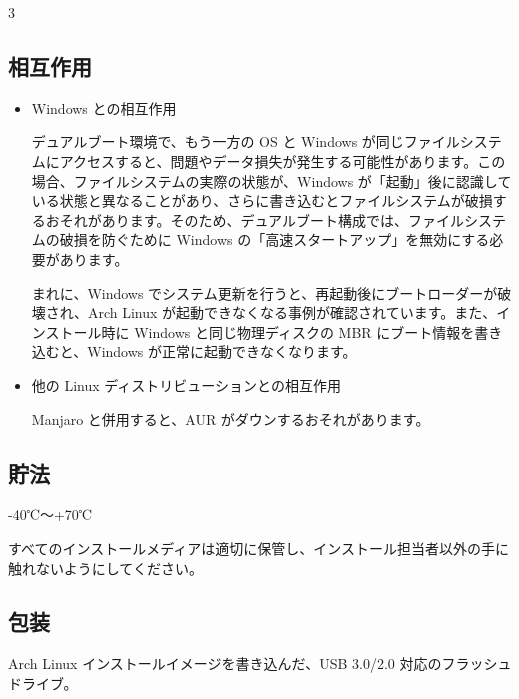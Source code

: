 \documentclass{article}
\begin{document}
\begin{multicols*}{3}
\begin{tcolorbox}
	\section*{相互作用}
	\end{tcolorbox}
	\begin{itemize}[leftmargin=*]
		\setlength{\parindent}{0pt}

		\item Windows との相互作用

		デュアルブート環境で、もう一方の OS と Windows が同じファイルシステムにアクセスすると、問題やデータ損失が発生する可能性があります。この場合、ファイルシステムの実際の状態が、Windows が「起動」後に認識している状態と異なることがあり、さらに書き込むとファイルシステムが破損するおそれがあります。そのため、デュアルブート構成では、ファイルシステムの破損を防ぐために Windows の「高速スタートアップ」を無効にする必要があります。

		まれに、Windows でシステム更新を行うと、再起動後にブートローダーが破壊され、Arch Linux が起動できなくなる事例が確認されています。また、インストール時に Windows と同じ物理ディスクの MBR にブート情報を書き込むと、Windows が正常に起動できなくなります。

		\item 他の Linux ディストリビューションとの相互作用

		Manjaro と併用すると、AUR がダウンするおそれがあります。

	\end{itemize}


	\begin{tcolorbox}
	\section*{貯法}
	\end{tcolorbox}

	-40℃〜+70℃

	すべてのインストールメディアは適切に保管し、インストール担当者以外の手に触れないようにしてください。

	\medskip


	\begin{tcolorbox}
	\section*{包装}
	\end{tcolorbox}

	Arch Linux インストールイメージを書き込んだ、USB 3.0/2.0 対応のフラッシュドライブ。


\end{multicols*}
\end{document}
